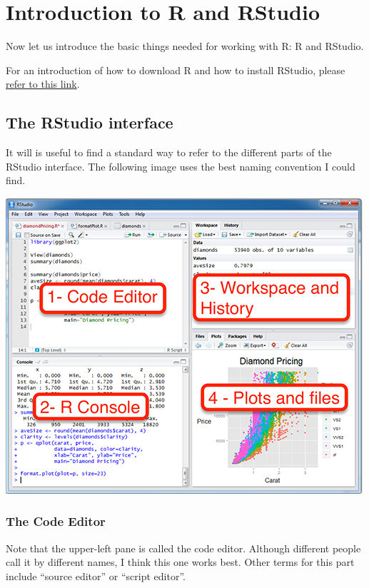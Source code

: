 \documentclass[]{book}
\begin{document}
\hypertarget{intro}{%
\chapter{Introduction to R and RStudio}\label{intro}}

Now let us introduce the basic things needed for working with R: R and RStudio.

For an introduction of how to download R and how to install RStudio, please \href{https://cengel.github.io/R-intro/backgroud.html}{refer to this link}.

\hypertarget{the-rstudio-interface}{%
\section{The RStudio interface}\label{the-rstudio-interface}}

It will is useful to find a standard way to refer to the different parts of the RStudio interface. The following image uses the best naming convention I could find.

\includegraphics{images/rstudio-interface.png}

\hypertarget{the-code-editor}{%
\subsection{The Code Editor}\label{the-code-editor}}

Note that the upper-left pane is called the code editor. Although different people call it by different names, I think this one works best. Other terms for this part include ``source editor'' or ``script editor''.
\end{document}
